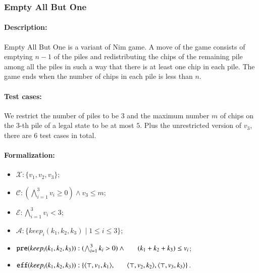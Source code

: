 \documentclass[review]{elsarticle}
\newcommand{\set}[1]{\{ #1 \}}
\newcommand{\tuple}[1]{\langle {#1} \rangle}
\newcommand{\true}{\top}
\newcommand{\statevar}{\mathcal{X}}
\newcommand{\act}{\mathcal{A}}
\newcommand{\constraint}{\mathcal{C}}
\newcommand{\estate}{\mathcal{E}}
\newcommand{\pre}{\mathtt{pre}}
\newcommand{\eff}{\mathtt{eff}}
\begin{document}
\subsubsection{Empty All But One \protect\cite{Fer1998}}
\paragraph{Description:}
Empty All But One is a variant of Nim game.
A move of the game consists of emptying $n - 1$ of the piles and redistributing the chips of the remaining pile among all the piles in such a way that there is at least one chip in each pile.
The game ends when the number of chips in each pile is less than $n$. 

\paragraph{Test cases:}
We restrict the number of piles to be $3$ and the maximum number $m$ of chips on the $3$-th pile of a legal state to be at most $5$. 
Plus the unrestricted version of $v_3$, there are $6$ test cases in total.

\paragraph{Formalization:}

\begin{itemize}
	\item $\statevar: \set{v_1, v_2, v_3}$;
	\item $\constraint: (\bigwedge_{i=1}^{3} v_i \ge 0) \wedge v_3 \le m$;
	\item $\estate: \bigwedge_{i=1}^{3} v_i < 3$;
	
	\item $\act:\set{keep_i(k_1, k_2, k_3){\mid}1\le i \le 3}$;
	\item $\pre(keep_i(k_1, k_2, k_3)) : (\bigwedge_{i=1}^{3} k_i > 0) \wedge \\ \hspace*{6mm}
	(k_1 + k_2 +k_3)\le v_i $;
	\item $\eff(keep_i(k_1, k_2, k_3)) : \set{\tuple{\true, v_1, k_1}, \\ \hspace*{6mm}
		\tuple{\true, v_2, k_2},\tuple{\true, v_3, k_3}}$.
	
	
\end{itemize}
\end{document}
